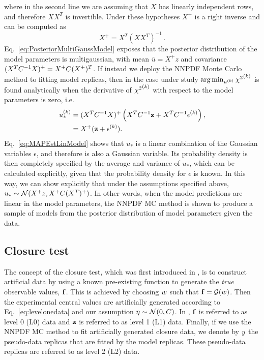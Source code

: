 where in the second line we are assuming that $X$ has linearly independent rows,
and therefore $X X^T$ is invertible. Under these hypotheses $X^+$ is a
right inverse and can be computed as
\begin{equation}
    \label{eq:RightInverse}
    X^+ = X^T \left(X X^T\right)^{-1}\, .
\end{equation}
Eq.~\ref{eq:PosteriorMultiGaussModel} exposes that the posterior distribution of
the model parameters is multigaussian, with mean $\bar{u} = X^+z$ and covariance
$(X^TC^{-1}_{}X)^+ = X^+ C (X^+)^T$. If instead we deploy the NNPDF Monte
Carlo method to fitting model replicas, then in the case under study
$\arg\min_{u^{(k)}} {\chi^2}^{(k)}$ is found analytically when the derivative of
${\chi^2}^{(k)}$ with respect to the model parameters is zero, i.e.
\begin{equation}
    \label{eq:MAPEstLinModel}
    \begin{split}
        u^{(k)}_* &= (X^TC^{-1}_{}X)^{+}
        \left( X^T C^{-1}_{} \mathbf{z} + X^T C^{-1}_{} \mathbf{\epsilon}^{(k)} \right), \\
        &= X^+ (\mathbf{z} + \mathbf{\epsilon}^{(k)}).
    \end{split}
\end{equation}
Eq.~\ref{eq:MAPEstLinModel} shows that $u_*$ is a linear combination of the
Gaussian variables $\epsilon$, and therefore is also a Gaussian variable. Its
probability density is then completely specified by the average and variance of
$u_*$, which can be calculated explicitly, given that the probability density
for $\epsilon$ is known.  In this way, we can show explicitly that under the
assumptions specified above, $u_* \sim \mathcal{N}( X^+z, X^+ C (X^T)^+)$.
In other words, when the model predictions are linear in the model parameters,
the NNPDF MC method is shown to produce a sample of models from the posterior
distribution of model parameters given the data.

\subsection{Closure test}
\label{sec:closure-test}

The concept of the closure test, which was first introduced in \cite{nnpdf30},
is to construct artificial data by using a known pre-existing function to
generate the {\em true} observable values, $\mathbf{f}$. This is achieved by
choosing $w$ such that $\mathbf{f} = \mathcal{G}(w)$. Then the
experimental central values are artificially generated according to
Eq.~\ref{eq:levelonedata} and our assumption $\mathbf{\eta} \sim \mathcal{N}(0,
C)$. In \cite{nnpdf30}, $\mathbf{f}$ is referred to as level 0 (L0) data and
$\mathbf{z}$ is referred to as level 1 (L1) data. Finally, if we use the NNPDF
MC method to fit artificially generated closure data, we denote by $y$ the
pseudo-data replicas that are fitted by the model replicas. These pseudo-data
replicas are referred to as level 2 (L2) data.

